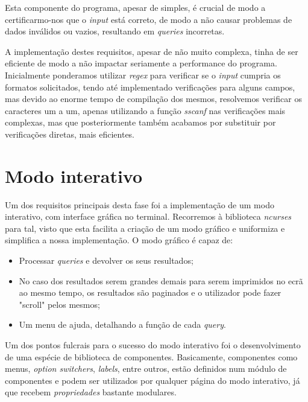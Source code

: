 \documentclass[12pt,a4paper]{report}
\begin{document}
    \par Esta componente do programa, apesar de simples, é crucial de modo a certificarmo-nos que o \textit{input} está correto, de modo a não causar problemas de dados inválidos ou vazios, resultando em \textit{queries} incorretas.
    \par A implementação destes requisitos, apesar de não muito complexa, tinha de ser eficiente de modo a não impactar seriamente a performance do programa. Inicialmente ponderamos utilizar \textit{regex} para verificar se o \textit{input} cumpria os formatos solicitados, tendo até implementado verificações para alguns campos, mas devido ao enorme tempo de compilação dos mesmos, resolvemos verificar os caracteres um a um, apenas utilizando a função \textit{sscanf} nas verificações mais complexas, mas que posteriormente também acabamos por substituir por verificações diretas, mais eficientes.

\newpage

    \chapter{Modo interativo}
    
     \par Um dos requisitos principais desta fase foi a implementação de um modo interativo, com interface gráfica no terminal. Recorremos à biblioteca \textit{ncurses} para tal, visto que esta facilita a criação de um modo gráfico e uniformiza e simplifica a nossa implementação. O modo gráfico é capaz de:
    
    \begin{itemize}
    \item Processar \textit{queries} e devolver os seus resultados;
    \item No caso dos resultados serem grandes demais para serem imprimidos no ecrã ao mesmo tempo, os resultados são paginados e o utilizador pode fazer "scroll" \space pelos mesmos;
    \item Um menu de ajuda, detalhando a função de cada \textit{query}.
    \end{itemize}
   
   	\par Um dos pontos fulcrais para o sucesso do modo interativo foi o desenvolvimento de uma espécie de biblioteca de componentes. Basicamente, componentes como menus, \textit{option switchers}, \textit{labels}, entre outros, estão definidos num módulo de componentes e podem ser utilizados por qualquer página do modo interativo, já que recebem \textit{propriedades} bastante modulares.
\end{document}
